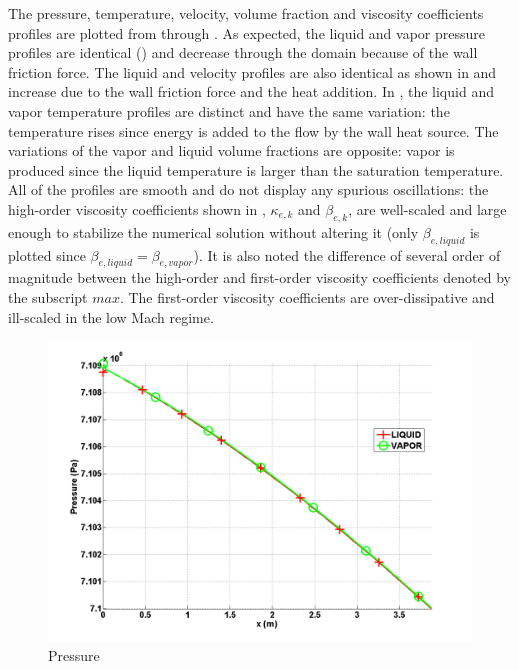The pressure, temperature, velocity, volume fraction and viscosity coefficients profiles are plotted from  through . As expected, the liquid and vapor pressure profiles are identical () and decrease through the domain because of the wall friction force. The liquid and velocity profiles are also identical as shown in  and increase due to the wall friction force and the heat addition. In , the liquid and vapor temperature profiles are distinct and have  the same variation: the temperature rises since energy is added to the flow by the wall heat source. The variations of the vapor and liquid volume fractions are opposite: vapor is produced since the liquid temperature is larger than the saturation temperature. All of the profiles are smooth and do not display any spurious oscillations: the high-order viscosity coefficients shown in , $\kappa_{e,k}$ and $\beta_{e,k}$, are well-scaled and large enough to stabilize the numerical solution without altering it (only $\beta_{e,liquid}$ is plotted since $\beta_{e,liquid}=\beta_{e,vapor}$). It is also noted the difference of several order of magnitude between the high-order and first-order viscosity coefficients denoted by the subscript $max$. The first-order viscosity coefficients are over-dissipative and ill-scaled in the low Mach regime.
%
        \begin{figure}[H]
                \centering
                \includegraphics[width=\textwidth]{figures/ANS_WINTER_2014_7Eqn_pressure.png}
                \caption{Pressure}
                \label{fig:pressure}
        \end{figure}%
